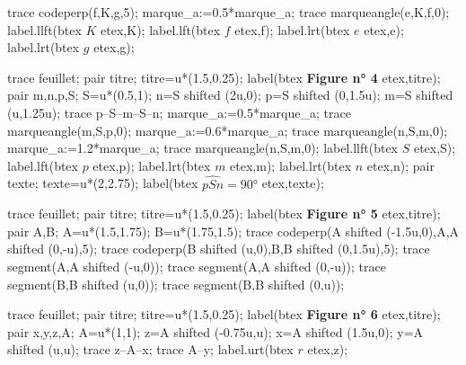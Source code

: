 \begin{corrige}
\begin{changemargin}{0mm}{-20mm}
\begin{Geometrie}[CoinHD={(3u,3u)}]
            trace codeperp(f,K,g,5);
            marque_a:=0.5*marque_a;
            trace marqueangle(e,K,f,0);
            label.llft(btex $K$ etex,K);
            label.lft(btex $f$ etex,f);
            label.lrt(btex $e$ etex,e);
            label.lrt(btex $g$ etex,g);
        \end{Geometrie}
        \par\smallskip
        \hspace*{-18mm}
        \begin{Geometrie}[CoinHD={(3u,3u)}]
            trace feuillet;
            pair titre;
            titre=u*(1.5,0.25);
            label(btex {\bfseries Figure n° 4 } etex,titre);
            pair m,n,p,S;
            S=u*(0.5,1);
            n=S shifted (2u,0);
            p=S shifted (0,1.5u);
            m=S shifted (u,1.25u);
            trace p--S--m--S--n;
            marque_a:=0.5*marque_a;
            trace marqueangle(m,S,p,0);
            marque_a:=0.6*marque_a;
            trace marqueangle(n,S,m,0);
            marque_a:=1.2*marque_a;
            trace marqueangle(n,S,m,0);
            label.llft(btex $S$ etex,S);
            label.lft(btex $p$ etex,p);
            label.lrt(btex $m$ etex,m);
            label.lrt(btex $n$ etex,n);
            pair texte;
            texte=u*(2,2.75);
            label(btex $\widehat{pSn}=\ang{90}$ etex,texte);
        \end{Geometrie}
        \begin{Geometrie}[CoinHD={(3u,3u)}]
            trace feuillet;
            pair titre;
            titre=u*(1.5,0.25);        
            label(btex {\bfseries Figure n° 5 } etex,titre);
            pair A,B;
            A=u*(1.5,1.75);
            B=u*(1.75,1.5);
            trace codeperp(A shifted (-1.5u,0),A,A shifted (0,-u),5);
            trace codeperp(B shifted (u,0),B,B shifted (0,1.5u),5);
            trace segment(A,A shifted (-u,0));
            trace segment(A,A shifted (0,-u));
            trace segment(B,B shifted (u,0));
            trace segment(B,B shifted (0,u));
        \end{Geometrie}
        \begin{Geometrie}[CoinHD={(3u,3u)}]
            trace feuillet;
            pair titre;
            titre=u*(1.5,0.25);
            label(btex {\bfseries Figure n° 6 } etex,titre);
            pair x,y,z,A;
            A=u*(1,1);
            z=A shifted (-0.75u,u);
            x=A shifted (1.5u,0);
            y=A shifted (u,u);
            trace z--A--x;
            trace A--y;
            label.urt(btex $r$ etex,z);

\end{Geometrie}
\end{changemargin}
\end{corrige}
